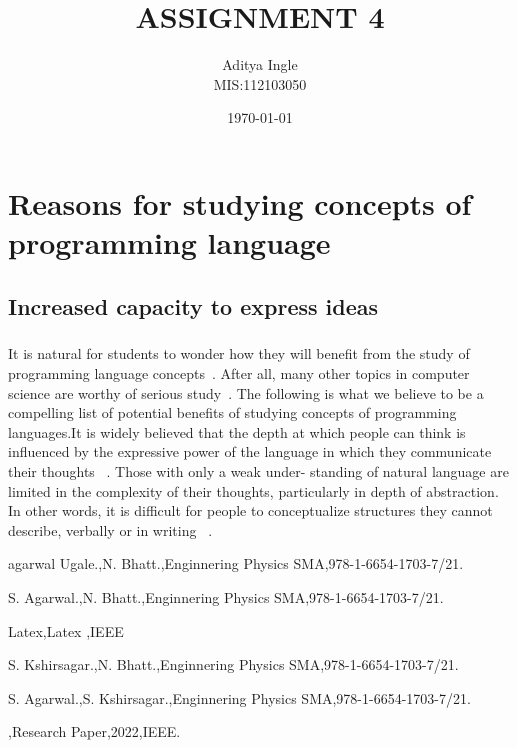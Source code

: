 \documentclass[12pt]{article}
\author{\large Aditya Ingle \\ MIS:112103050}
\date{\today}
\begin{document}
\raggedright
\title{\huge \bf ASSIGNMENT 4}
\maketitle
{}
\newpage
{}
\newpage
\section{Reasons for studying concepts of programming language}
\subsection{Increased capacity to express ideas}
\subparagraph{}It is natural for students to wonder how they will benefit from the study of programming language concepts~\cite{Paper}. After all, many other topics in computer science
are worthy of serious study~\cite{Latex}. The following is what we believe to be a compelling
list of potential benefits of studying concepts of programming languages.It is widely believed that the depth at which
people can think is influenced by the expressive power of the language in
which they communicate their thoughts ~\cite{aa,agarwal}. Those with only a weak under-
standing of natural language are limited in the complexity of their thoughts,
particularly in depth of abstraction. In other words, it is difficult for people
to conceptualize structures they cannot describe, verbally or in writing ~\cite{agarwal,Kshir,rucha}.


\begin{thebibliography} {}

agarwal Ugale.,N. Bhatt.,Enginnering Physics SMA,978-1-6654-1703-7/21.

 S. Agarwal.,N. Bhatt.,Enginnering Physics SMA,978-1-6654-1703-7/21.

 Latex,Latex ,IEEE

 S. Kshirsagar.,N. Bhatt.,Enginnering Physics SMA,978-1-6654-1703-7/21.

 S. Agarwal.,S. Kshirsagar.,Enginnering Physics SMA,978-1-6654-1703-7/21.

 ,Research Paper,2022,IEEE.
\end{thebibliography}
\newpage
\end{document}
